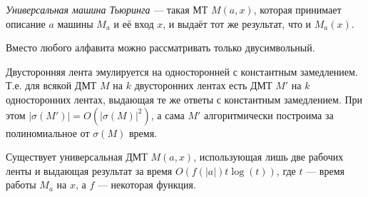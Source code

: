 \documentclass[12pt,a4paper]{article}
\begin{document}
    \begin{definition}
        \emph{Универсальная машина Тьюринга} --- такая МТ $M(a, x)$, которая принимает описание $a$ машины $M_a$ и её вход $x$, и выдаёт тот же результат, что и $M_a(x)$.
    \end{definition}

    \begin{lemma}
        Вместо любого алфавита можно рассматривать только двусимвольный.
    \end{lemma}


        

    \begin{lemma}
        Двусторонняя лента эмулируется на односторонней с константным замедлением. Т.е. для всякой ДМТ $M$ на $k$ двусторонних лентах есть ДМТ $M'$ на $k$ односторонних лентах, выдающая те же ответы с константным замедлением. При этом $|\sigma(M')| = O(|\sigma(M)|^2)$, а сама $M'$ алгоритмически построима за полиномиальное от $\sigma(M)$ время.
    \end{lemma}


    \begin{theorem}
        Существует универсальная ДМТ $M(a, x)$, использующая лишь две рабочих ленты и выдающая результат за время $O(f(|a|) t \log(t))$, где $t$ --- время работы $M_a$ на $x$, а $f$ --- некоторая функция.
    \end{theorem}
\end{document}
